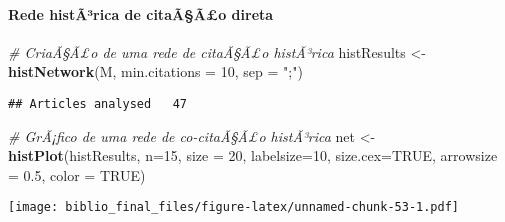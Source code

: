 \documentclass[]{article}
\newenvironment{Shaded}{\begin{snugshade}}{\end{snugshade}}
\newcommand{\KeywordTok}[1]{\textcolor[rgb]{0.13,0.29,0.53}{\textbf{#1}}}
\newcommand{\DataTypeTok}[1]{\textcolor[rgb]{0.13,0.29,0.53}{#1}}
\newcommand{\DecValTok}[1]{\textcolor[rgb]{0.00,0.00,0.81}{#1}}
\newcommand{\FloatTok}[1]{\textcolor[rgb]{0.00,0.00,0.81}{#1}}
\newcommand{\StringTok}[1]{\textcolor[rgb]{0.31,0.60,0.02}{#1}}
\newcommand{\CommentTok}[1]{\textcolor[rgb]{0.56,0.35,0.01}{\textit{#1}}}
\newcommand{\OtherTok}[1]{\textcolor[rgb]{0.56,0.35,0.01}{#1}}
\newcommand{\NormalTok}[1]{#1}
\let\oldparagraph\paragraph
\renewcommand{\paragraph}[1]{\oldparagraph{#1}\mbox{}}
\begin{document}
\paragraph{Rede histÃ³rica de citaÃ§Ã£o
direta}\label{rede-histarica-de-citaaao-direta}

\begin{Shaded}
\begin{Highlighting}[]
\CommentTok{# CriaÃ§Ã£o de uma rede de citaÃ§Ã£o histÃ³rica}
\NormalTok{histResults <-}\StringTok{ }\KeywordTok{histNetwork}\NormalTok{(M, }\DataTypeTok{min.citations =} \DecValTok{10}\NormalTok{, }\DataTypeTok{sep =} \StringTok{";"}\NormalTok{)}
\end{Highlighting}
\end{Shaded}

\begin{verbatim}
## Articles analysed   47
\end{verbatim}

\begin{Shaded}
\begin{Highlighting}[]
\CommentTok{# GrÃ¡fico de uma rede de co-citaÃ§Ã£o histÃ³rica}
\NormalTok{net <-}\StringTok{ }\KeywordTok{histPlot}\NormalTok{(histResults, }\DataTypeTok{n=}\DecValTok{15}\NormalTok{, }\DataTypeTok{size =} \DecValTok{20}\NormalTok{, }\DataTypeTok{labelsize=}\DecValTok{10}\NormalTok{, }\DataTypeTok{size.cex=}\OtherTok{TRUE}\NormalTok{, }\DataTypeTok{arrowsize =} \FloatTok{0.5}\NormalTok{, }\DataTypeTok{color =} \OtherTok{TRUE}\NormalTok{)}
\end{Highlighting}
\end{Shaded}

\texttt{[image: biblio\_final\_files/figure-latex/unnamed-chunk-53-1.pdf]}
\end{document}
